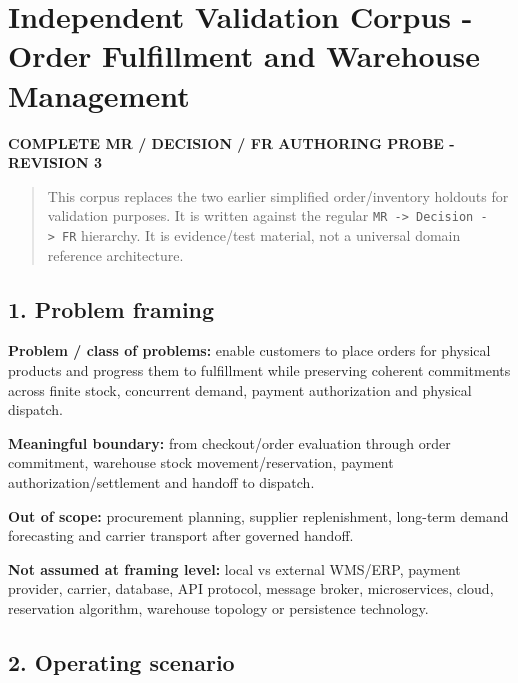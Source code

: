 \documentclass[
  10pt,
]{article}
\author{}
\date{}
\begin{document}
\section{Independent Validation Corpus - Order Fulfillment and Warehouse
Management}\label{independent-validation-corpus---order-fulfillment-and-warehouse-management}

\textbf{COMPLETE MR / DECISION / FR AUTHORING PROBE - REVISION 3}

\begin{quote}
This corpus replaces the two earlier simplified order/inventory holdouts
for validation purposes. It is written against the regular
\texttt{MR\ -\textgreater{}\ Decision\ -\textgreater{}\ FR} hierarchy.
It is evidence/test material, not a universal domain reference
architecture.
\end{quote}

\subsection{1. Problem framing}\label{1-problem-framing}

\textbf{Problem / class of problems:} enable customers to place orders
for physical products and progress them to fulfillment while preserving
coherent commitments across finite stock, concurrent demand, payment
authorization and physical dispatch.

\textbf{Meaningful boundary:} from checkout/order evaluation through
order commitment, warehouse stock movement/reservation, payment
authorization/settlement and handoff to dispatch.

\textbf{Out of scope:} procurement planning, supplier replenishment,
long-term demand forecasting and carrier transport after governed
handoff.

\textbf{Not assumed at framing level:} local vs external WMS/ERP,
payment provider, carrier, database, API protocol, message broker,
microservices, cloud, reservation algorithm, warehouse topology or
persistence technology.

\subsection{2. Operating scenario}\label{2-operating-scenario}
\end{document}
